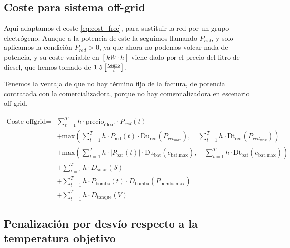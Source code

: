 \subsection{Coste para sistema off-grid}

Aquí adaptamos el coste \ref{eq:cost_free}, para sustituir la red por un grupo
electrógeno. Aunque a la potencia de este la seguimos llamando $P_{red}$, y
solo aplicamos la condición $P_{red} > 0$, ya que ahora no podemos volcar nada
de potencia, y su coste variable en $[kW\cdot h]$ viene dado por el precio del
litro de diesel, que hemos tomado de $1.5 \left[\frac{\text{\euro}}{l}\right]$.

Tenemos la ventaja de que no hay término fijo de la factura, de potencia
contratada con la comercializadora, porque no hay comercializadora en escenario
off-grid.

\begin{equation} \label{eq:cost_offgrid}
	\begin{split}
		\text{Coste\_offgrid} = & \sum_{t=1}^{T} h \cdot \text{precio}_\text{diesel} \cdot P_{red}(t)                                                                                                                    \\
		                        & + \text{max} \left( \sum_{t=1}^{T} h \cdot P_\text{red}(t) \cdot \text{Du}_\text{red}(P_{red_{max}}), \quad \sum_{t=1}^{T} h \cdot \text{Dt}_\text{red}(P_{red_{max}}) \right)         \\
		                        & + \text{max} \left( \sum_{t=1}^{T} h \cdot |P_\text{bat}(t)| \cdot \text{Du}_\text{bat}(e_\text{bat,max}), \quad \sum_{t=1}^{T} h \cdot \text{Dt}_\text{bat}(e_\text{bat,max}) \right) \\
		                        & + \sum_{t=1}^{T} h \cdot D_\text{solar}(S)                                                                                                                                             \\
		                        & + \sum_{t=1}^{T} h \cdot P_\text{bomba}(t) \cdot D_\text{bomba}(P_\text{bomba,max})                                                                                                    \\
		                        & + \sum_{t=1}^{T} h \cdot D_\text{tanque}(V)
	\end{split}
\end{equation}


\subsection{Penalización por desvío respecto a la temperatura objetivo}

